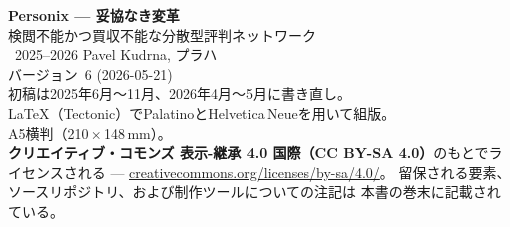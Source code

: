 \thispagestyle{empty}
\ifdefined\printmode\vspace*{\fill}\else{}\fi
\begin{flushleft}\small\sffamily
\textbf{Personix — 妥協なき変革}\\[0.3em]
検閲不能かつ買収不能な分散型評判ネットワーク\\[1.4em]

\textcopyright\ 2025--2026 Pavel Kudrna, プラハ\\[0.4em]

バージョン~6 (2026-05-21)\\
初稿は2025年6月〜11月、2026年4月〜5月に書き直し。\\[1.4em]

\LaTeX{}（Tectonic）でPalatinoとHelvetica\,Neueを用いて組版。\\
A5横判（210\,$\times$\,148\,mm）。\\[1.4em]

\textbf{クリエイティブ・コモンズ 表示-継承 4.0
国際（CC BY-SA 4.0）}のもとでライセンスされる ---
\href{https://creativecommons.org/licenses/by-sa/4.0/}{creativecommons.org/licenses/by-sa/4.0/}。
留保される要素、ソースリポジトリ、および制作ツールについての注記は
本書の巻末に記載されている。
\end{flushleft}
\ifdefined\printmode\else{}\fi
\clearpage
